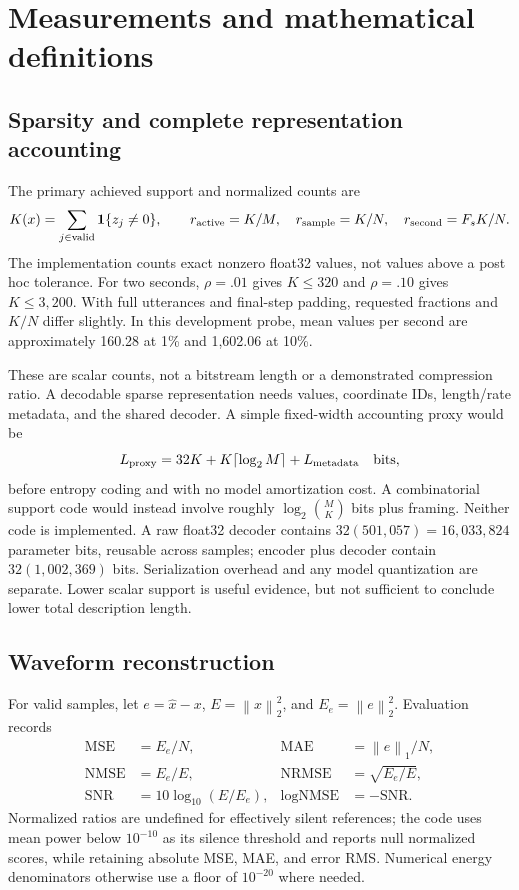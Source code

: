 \documentclass[11pt,a4paper]{article}
\newcommand{\norm}[1]{\left\lVert#1\right\rVert}
\begin{document}
\section{Measurements and mathematical definitions}
\subsection{Sparsity and complete representation accounting}
The primary achieved support and normalized counts are
\begin{equation}
 K(x)=\sum_{j\in\text{valid}}\mathbf1\{z_j\ne0\},\qquad
 r_{\rm active}=K/M,\quad
 r_{\rm sample}=K/N,\quad
 r_{\rm second}=F_s K/N.
\end{equation}
The implementation counts exact nonzero float32 values, not values above a post hoc tolerance. For two seconds, $\rho=.01$ gives $K\le320$ and $\rho=.10$ gives $K\le3{,}200$. With full utterances and final-step padding, requested fractions and $K/N$ differ slightly. In this development probe, mean values per second are approximately 160.28 at 1\% and 1,602.06 at 10\%.

These are scalar counts, not a bitstream length or a demonstrated compression ratio. A decodable sparse representation needs values, coordinate IDs, length/rate metadata, and the shared decoder. A simple fixed-width accounting proxy would be
\begin{equation}
 L_{\rm proxy}=32K+K\lceil\log_2 M\rceil+L_{\rm metadata}
 \quad\text{bits},
\end{equation}
before entropy coding and with no model amortization cost. A combinatorial support code would instead involve roughly $\log_2\binom{M}{K}$ bits plus framing. Neither code is implemented. A raw float32 decoder contains $32(501{,}057)=16{,}033{,}824$ parameter bits, reusable across samples; encoder plus decoder contain $32(1{,}002{,}369)$ bits. Serialization overhead and any model quantization are separate. Lower scalar support is useful evidence, but not sufficient to conclude lower total description length.

\subsection{Waveform reconstruction}
For valid samples, let $e=\widehat x-x$, $E=\norm{x}_2^2$, and $E_e=\norm{e}_2^2$. Evaluation records
\begin{align}
 \mathrm{MSE}&=E_e/N,& \mathrm{MAE}&=\norm{e}_1/N,\\
 \mathrm{NMSE}&=E_e/E,& \mathrm{NRMSE}&=\sqrt{E_e/E},\\
 \mathrm{SNR}&=10\log_{10}(E/E_e),& \mathrm{logNMSE}&=-\mathrm{SNR}.
\end{align}
Normalized ratios are undefined for effectively silent references; the code uses mean power below $10^{-10}$ as its silence threshold and reports null normalized scores, while retaining absolute MSE, MAE, and error RMS. Numerical energy denominators otherwise use a floor of $10^{-20}$ where needed.
\end{document}

